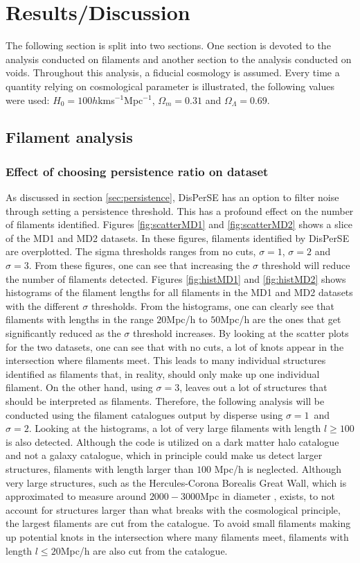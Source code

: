 \chapter{Results/Discussion}\label{sec:results}
The following section is split into two sections. One section is devoted to the analysis conducted on filaments and another section to the analysis conducted on voids. Throughout this analysis, a fiducial cosmology is assumed. Every time a quantity relying on cosmological parameter is illustrated, the following values were used: $H_0=100h$kms$^{-1}$Mpc$^{-1}$, $\Omega_m=0.31$ and $\Omega_\Lambda=0.69$. 
\section{Filament analysis}\label{sec:filaments}

\subsection{Effect of choosing persistence ratio on dataset}
As discussed in section \ref{sec:persistence}, DisPerSE has an option to filter
noise through setting a persistence threshold. This has a profound effect on the number of filaments identified. Figures \ref{fig:scatterMD1} and \ref{fig:scatterMD2} shows a slice of the MD1 and MD2 datasets. In these figures, filaments identified by DisPerSE are overplotted. The sigma thresholds ranges from no cuts, $\sigma=1$, $\sigma=2$ and $\sigma=3$. From these figures, one can see that increasing the $\sigma$ threshold will reduce the number of filaments detected. Figures \ref{fig:histMD1} and \ref{fig:histMD2} shows histograms of the filament lengths for all filaments in the MD1 and MD2 datasets with the different $\sigma$ thresholds. From the histograms, one can clearly see that filaments with lengths in the range $20$Mpc/h to $50$Mpc/h are the ones that get significantly reduced as the $\sigma$ threshold increases. By looking at the scatter plots for the two datasets, one can see that with no cuts, a lot of knots appear in the intersection where filaments meet. This leads to many individual structures identified as filaments that, in reality, should only make up one individual filament. On the other hand, using $\sigma=3$, leaves out a lot of structures that should be interpreted as filaments. Therefore, the following analysis will be conducted using the filament catalogues output by disperse using $\sigma=1$ and $\sigma=2$. Looking at the histograms, a lot of very large filaments with length $l\geq 100$ is also detected. Although the code is utilized on a dark matter halo catalogue and not a galaxy catalogue, which in principle could make us detect larger structures, filaments with length larger than $100$ Mpc/h is neglected. Although very large structures, such as the Hercules-Corona Borealis Great Wall, which is approximated to measure around $2000-3000$Mpc in diameter \cite{herculescorona}, exists, to not account for structures larger than what breaks with the cosmological principle, the largest filaments are cut from the catalogue. To avoid small filaments making up potential knots in the intersection where many filaments meet, filaments with length $l\leq 20$Mpc/h are also cut from the catalogue.
